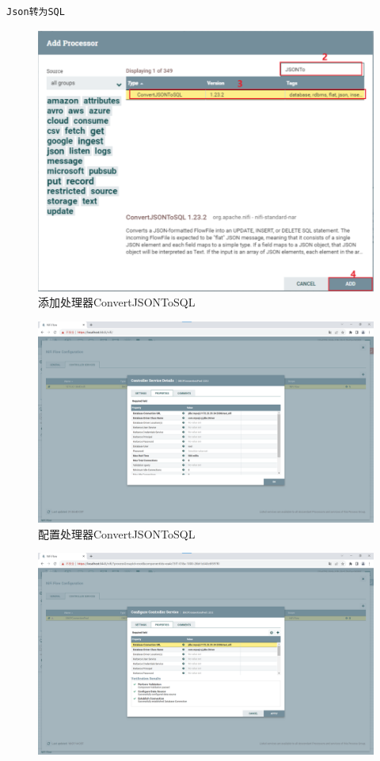 \documentclass{article}
\begin{document}
\begin{enumerate}
\begin{lstlisting}
Json转为SQL
    \end{lstlisting}
    \begin{figure}[htp]
        \centering
        \includegraphics[width=13cm]{添加jsonTo.png}
        \caption{添加处理器ConvertJSONToSQL}
        \label{pic6}
    \end{figure}
    \begin{figure}[htp]
        \centering
        \includegraphics[width=13cm]{配置jsonTo.png}
        \caption{配置处理器ConvertJSONToSQL}
        \label{pic6}
    \end{figure}
    \begin{figure}[htp]
        \centering
        \includegraphics[width=13cm]{jdbc.png}

\end{figure}
\end{enumerate}
\end{document}
